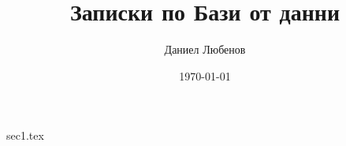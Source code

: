 \documentclass[a4paper,12pt]{article}
\title{Записки по Бази от данни}
\author{Даниел Любенов}
\date{\today}
\begin{document}
\maketitle

\newpage

\tableofcontents

\newpage

{sec1.tex}
\end{document}
